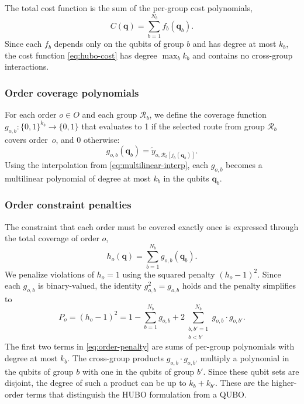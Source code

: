 \documentclass{article}
\begin{document}
The total cost function is the sum of the per-group cost polynomials,
\begin{equation}
    C(\mathbf{q}) = \sum_{b=1}^{N_b} f_b(\mathbf{q}_b).
    \label{eq:hubo-cost}
\end{equation}
Since each $f_b$ depends only on the qubits of group $b$ and has degree at most $k_b$, the cost function \eqref{eq:hubo-cost} has degree $\max_b k_b$ and contains no cross-group interactions.


\subsubsection{Order coverage polynomials}
For each order $o \in O$ and each group $\mathcal{R}_b$, we define the coverage function $g_{o,b} : \{0,1\}^{k_b} \to \{0,1\}$ that evaluates to 1 if the selected route from group $\mathcal{R}_b$ covers order~$o$, and 0 otherwise:
\begin{equation}
    g_{o,b}(\mathbf{q}_b) = \tilde{y}_{o,\mathcal{R}_b[j_b(\mathbf{q}_b)]}.
    \label{eq:coverage-function}
\end{equation}
Using the interpolation from \eqref{eq:multilinear-interp}, each $g_{o,b}$ becomes a multilinear polynomial of degree at most $k_b$ in the qubits $\mathbf{q}_b$.


\subsubsection{Order constraint penalties}
The constraint that each order must be covered exactly once is expressed through the total coverage of order $o$,
\begin{equation}
    h_o(\mathbf{q}) = \sum_{b=1}^{N_b} g_{o,b}(\mathbf{q}_b).
    \label{eq:total-coverage}
\end{equation}
We penalize violations of $h_o = 1$ using the squared penalty $(h_o - 1)^2$.
Since each $g_{o,b}$ is binary-valued, the identity $g_{o,b}^2 = g_{o,b}$ holds and the penalty simplifies to
\begin{equation}
    P_o = (h_o - 1)^2 = 1 - \sum_{b=1}^{N_b} g_{o,b} + 2 \sum_{\substack{b, b' = 1 \\ b < b'}}^{N_b} g_{o,b} \cdot g_{o,b'}.
    \label{eq:order-penalty}
\end{equation}
The first two terms in \eqref{eq:order-penalty} are sums of per-group polynomials with degree at most $k_b$.
The cross-group products $g_{o,b} \cdot g_{o,b'}$ multiply a polynomial in the qubits of group $b$ with one in the qubits of group $b'$. Since these qubit sets are disjoint, the degree of such a product can be up to $k_b + k_{b'}$. These are the higher-order terms that distinguish the HUBO formulation from a QUBO.
\end{document}
